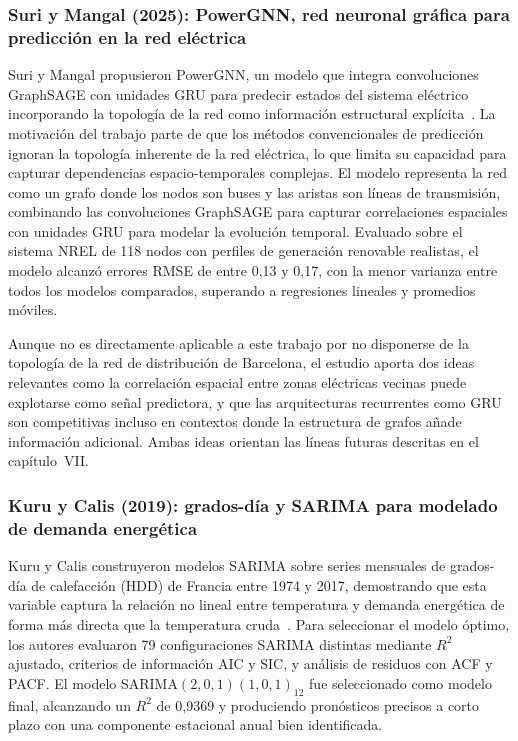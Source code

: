 \documentclass[12pt, a4paper]{article}
\begin{document}
\subsubsection{Suri y Mangal (2025): PowerGNN, red neuronal gráfica para predicción en la red eléctrica}

Suri y Mangal propusieron PowerGNN, un modelo que integra convoluciones GraphSAGE con unidades GRU para predecir estados del sistema eléctrico incorporando la topología de la red como información estructural explícita~\cite{suri2025}. La motivación del trabajo parte de que los métodos convencionales de predicción ignoran la topología inherente de la red eléctrica, lo que limita su capacidad para capturar dependencias espacio-temporales complejas. El modelo representa la red como un grafo donde los nodos son buses y las aristas son líneas de transmisión, combinando las convoluciones GraphSAGE para capturar correlaciones espaciales con unidades GRU para modelar la evolución temporal. Evaluado sobre el sistema NREL de 118 nodos con perfiles de generación renovable realistas, el modelo alcanzó errores RMSE de entre 0,13 y 0,17, con la menor varianza entre todos los modelos comparados, superando a regresiones lineales y promedios móviles.

Aunque no es directamente aplicable a este trabajo por no disponerse de la topología de la red de distribución de Barcelona, el estudio aporta dos ideas relevantes como la correlación espacial entre zonas eléctricas vecinas puede explotarse como señal predictora, y que las arquitecturas recurrentes como GRU son competitivas incluso en contextos donde la estructura de grafos añade información adicional. Ambas ideas orientan las líneas futuras descritas en el capítulo~VII.

\subsubsection{Kuru y Calis (2019): grados-día y SARIMA para modelado de demanda energética}

Kuru y Calis construyeron modelos SARIMA sobre series mensuales de grados-día de calefacción (HDD) de Francia entre 1974 y 2017, demostrando que esta variable captura la relación no lineal entre temperatura y demanda energética de forma más directa que la temperatura cruda~\cite{kuru2019}. Para seleccionar el modelo óptimo, los autores evaluaron 79 configuraciones SARIMA distintas mediante $R^2$ ajustado, criterios de información AIC y SIC, y análisis de residuos con ACF y PACF. El modelo SARIMA$(2,0,1)(1,0,1)_{12}$ fue seleccionado como modelo final, alcanzando un $R^2$ de 0,9369 y produciendo pronósticos precisos a corto plazo con una componente estacional anual bien identificada.
\end{document}
